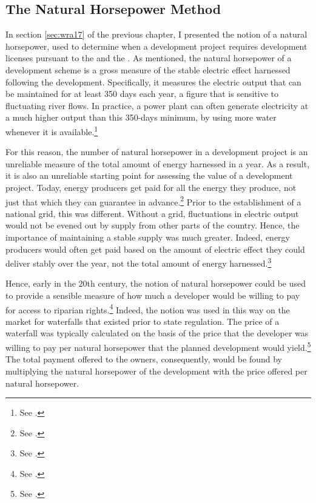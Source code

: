 \subsection{The Natural Horsepower Method}\label{sec:5:4:1}

In section \ref{sec:wra17} of the previous chapter, I presented the notion of a natural horsepower, used to determine when a development project requires development licenses pursuant to the \cite{wra17} and the \cite{ica17}. As mentioned, the natural horsepower of a development scheme is a gross measure of the stable electric effect harnessed following the development. Specifically, it measures the electric output that can be maintained for at least 350 days each year, a figure that is sensitive to fluctuating river flows. In practice, a power plant can often generate electricity at a much higher output than this 350-days minimum, by using more water whenever it is available.\footnote{See \cite{sofienlund07}.}

For this reason, the number of natural horsepower in a development project is an unreliable measure of the total amount of energy harnessed in a year. As a result, it is also an unreliable starting point for assessing the value of a development project. Today, energy producers get paid for all the energy they produce, not just that which they can guarantee in advance.\footnote{See \cite[83-84]{uleberg08}.} Prior to the establishment of a national grid, this was different. Without a grid, fluctuations in electric output would not be evened out by supply from other parts of the country. Hence, the importance of maintaining a stable supply was much greater. Indeed, energy producers would often get paid based on the amount of electric effect they could deliver stably over the year, not the total amount of energy harnessed.\footnote{See \cite[83]{uleberg08}.}

Hence, early in the 20th century, the notion of natural horsepower could be used to provide a sensible measure of how much a developer would be willing to pay for access to riparian rights.\footnote{See \cite[83]{uleberg08}.} Indeed, the notion was used in this way on the market for waterfalls that existed prior to state regulation. The price of a waterfall was typically calculated on the basis of the price that the developer was willing to pay per natural horsepower that the planned development would yield.\footnote{See \cite[83]{uleberg08}.} The total payment offered to the owners, consequently, would be found by multiplying the natural horsepower of the development with the price offered per natural horsepower.

